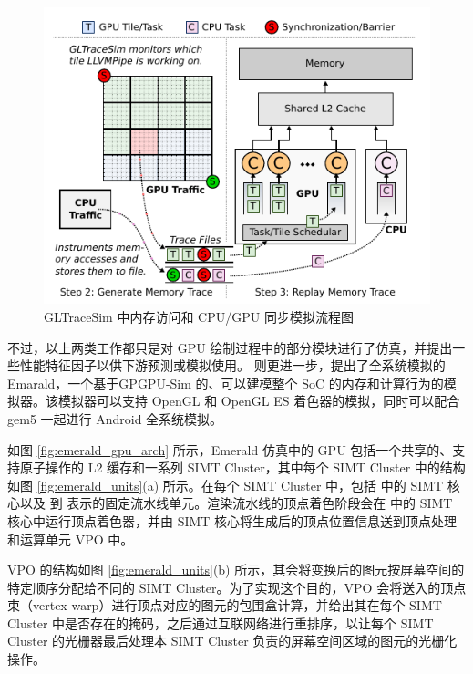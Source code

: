 \begin{figure}
    \centering
    \includegraphics{figures/GLTraceSim.pdf}
    \caption{GLTraceSim 中内存访问和 CPU/GPU 同步模拟流程图\cite{8167756}}
    \label{fig:gltracesim}
\end{figure}


不过，以上两类工作都只是对 GPU 绘制过程中的部分模块进行了仿真，并提出一些性能特征因子以供下游预测或模拟使用。\citet{10.1145/3307650.3322221} 则更进一步，提出了全系统模拟的 Emarald，一个基于GPGPU-Sim \cite{4919648} 的、可以建模整个 SoC 的内存和计算行为的模拟器。该模拟器可以支持 OpenGL 和 OpenGL ES 着色器的模拟，同时可以配合 gem5 一起进行 Android 全系统模拟。

如图 \ref{fig:emerald_gpu_arch} 所示，Emerald 仿真中的 GPU 包括一个共享的、支持原子操作的 L2 缓存和一系列 SIMT Cluster，其中每个 SIMT Cluster 中的结构如图 \ref{fig:emerald_units}(a) 所示。在每个 SIMT Cluster 中，包括  中的 SIMT 核心以及  到  表示的固定流水线单元。渲染流水线的顶点着色阶段会在  中的 SIMT 核心中运行顶点着色器，并由 SIMT 核心将生成后的顶点位置信息送到顶点处理和运算单元 VPO 中。

VPO 的结构如图 \ref{fig:emerald_units}(b) 所示，其会将变换后的图元按屏幕空间的特定顺序分配给不同的 SIMT Cluster。为了实现这个目的，VPO 会将送入的顶点束（vertex warp）进行顶点对应的图元的包围盒计算，并给出其在每个 SIMT Cluster 中是否存在的掩码，之后通过互联网络进行重排序，以让每个 SIMT Cluster 的光栅器最后处理本 SIMT Cluster 负责的屏幕空间区域的图元的光栅化操作。

